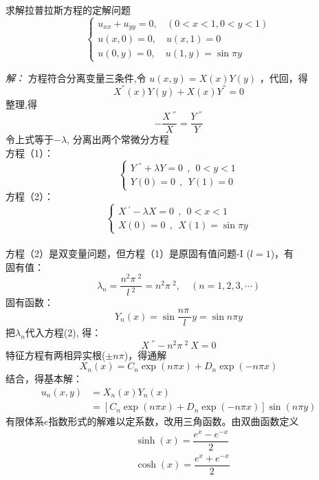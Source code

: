 \begin{example}
 求解拉普拉斯方程的定解问题
 \begin{equation}\label{eq:laplace2}
 \displaystyle \begin{cases}
	u_{xx} +u_{yy} =0 ,~~~~ (0<x<1, 0<y<1)\\
	u(x,0)= 0, \quad u(x,1)= 0 \\
	u(0,y)=0, \quad u(1,y)= \sin \pi y
\end{cases}  
\end{equation}
\end{example}
\emph{解：}
方程符合分离变量三条件,令 $ u(x,y)=X(x)Y(y)$ ，代回，得 
\begin{equation*}
	X^{''}(x)Y(y) +X(x)Y^{''}=0
\end{equation*}
整理,得
\begin{equation*}
	-\frac{X~^{''}}{X}=\frac{Y~^{''} }{Y}
\end{equation*}	
令上式等于$-\lambda$, 分离出两个常微分方程 \\
方程（1）：\\
$$\displaystyle  \begin{cases}
	Y~^{''} +\lambda Y=0  ~~,~~ 0<y<1\\
	Y(0)=0 ~~,~~Y(1)=0 
\end{cases}$$ 	
方程（2）：\\
$$\displaystyle  \begin{cases}
	X~^{'} -\lambda X=0  ~~,~~ 0<x<1 \\
	X(0)=0~~,~~X(1)=\sin \pi y 
\end{cases}$$ 
~~\\ 
方程（2）是双变量问题，但方程（1）是原固有值问题-I ($l=1$)，有\\
固有值：$$\displaystyle  \lambda_n=\frac{n^2\pi~^2}{l~^2} =n^2\pi~^2, \quad (n=1,2,3,\cdots) $$  
固有函数： $$\displaystyle  Y_n(x)= \sin \frac{n\pi~}{l} y = \sin n \pi y $$
把$\lambda_n$代入方程(2), 得：
$$\displaystyle  X~^{''} - n^2\pi~^2~X=0 $$ 
特征方程有两相异实根($ \pm n\pi $)，得通解 
\begin{equation*}
	X_n(x)=C_n \exp(n\pi x )+ D_n \exp(-n\pi x )
\end{equation*}	
结合，得基本解：
$$\displaystyle \begin{aligned}
	u_n(x,y)&= X_n (x)Y_n (x) \\
	&= [C_n \exp(n\pi x )+ D_n \exp(-n\pi x )] \sin (n \pi y)  
\end{aligned}$$ 
有限体系$e$指数形式的解难以定系数，改用三角函数。由双曲函数定义
$$\displaystyle \begin{aligned}
	&\sinh(x) = \dfrac{e^x -e^{-x}}{2} \\
	&\cosh(x) = \dfrac{e^x +e^{-x}}{2} 
\end{aligned}$$
